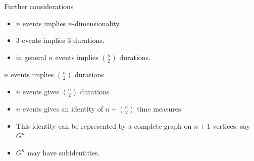\documentclass[20pt]{beamer}
\begin{document}

\begin{frame}[plain]
\begin{center}
\Large Further considerations
\begin{itemize}[<+->]
  \item $n$ events implies $n$-dimensionality
  \item 3 events implies 3 durations.
  \item in general $n$ events implies $\binom{n}{2}$ durations.
\end{itemize}
\end{center}
\end{frame}


\begin{frame}[plain]
\begin{center}
\Large $n$ events implies $\binom{n}{2}$ durations


\end{center}
\end{frame}


\begin{frame}[plain]
\begin{center}
\Large
\begin{itemize}[<+->]
  \item $n$ events gives $\binom{n}{2}$ durations
  \item $n$ events gives an identity of $n + \binom{n}{2}$ time measures
  \item This identity can be represented by a complete graph on $n+1$ vertices,
  say $G^n$.
  \item $G^n$ may have subidentities.
\end{itemize}

\end{center}
\end{frame}
\end{document}
